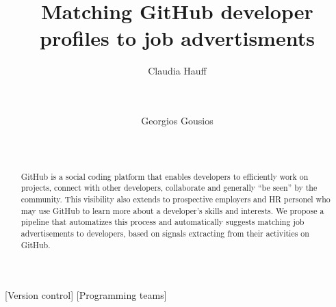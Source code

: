 \documentclass{sig-alternate}
\begin{document}
\newcommand{\ghtorrent}{ \textsc{ght}orrent\xspace}
\newcommand{\api}{\textsc{api}\xspace}

\newcommand{\nb}[3]{
  \fcolorbox{black}{#2}{\bfseries\sffamily\scriptsize#1}
    {\sf\small$\blacktriangleright$\textit{#3}$\blacktriangleleft$}
}

\newcommand\georgios[1]{\nb{Georgios}{yellow}{#1}}
\newcommand\alberto[1]{\nb{Claudia}{cyan}{#1}}


\newcommand{\hassanbox}[1]
{
  \vspace{0.29em}
  \noindent
  \fbox{
  \begin{minipage}{0.46\textwidth}
    \emph{\noindent #1}
    \end{minipage}
}}

\newcommand{\resp}[2]{{\sc R#1:} ``\emph{#2}''}
\newcommand{\respnum}[1]{{\sc R#1}}
\newcommand{\code}[1]{{\textsl{#1}}}

\title{Matching GitHub developer profiles to job advertisments}

\author{
\alignauthor
Claudia Hauff\\
       \\
       \\
\and
Georgios Gousios\\
       \\
       \\
}

\maketitle

\begin{abstract}
GitHub is a social coding platform that enables developers to efficiently work on projects, connect with other developers, collaborate and generally ``be seen'' by the community. This visibility also extends to prospective employers and HR personel who may use GitHub to learn more about a developer's skills and interests. We propose a pipeline that automatizes this process and automatically suggests matching job advertisements to developers, based on signals extracting from their activities on GitHub.
\end{abstract}

[Version control]
[Programming teams]
\end{document}
